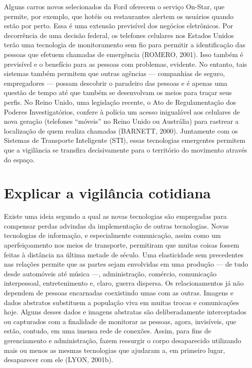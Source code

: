 Alguns carros novos selecionados da Ford oferecem o serviço On-Star, que
permite, por exemplo, que hotéis ou restaurantes alertem os usuários
quando estão por perto. Essa é uma extensão previsível dos negócios
eletrônicos. Por decorrência de uma decisão federal, os telefones
celulares nos Estados Unidos terão uma tecnologia de monitoramento sem
fio para permitir a identificação das pessoas que efetuem chamadas de
emergência (ROMERO, 2001). Isso também é previsível e o benefício para
as pessoas com problemas, evidente. No entanto, tais sistemas também
permitem que outras agências --- companhias de seguro, empregadores ---
possam descobrir o paradeiro das pessoas e é apenas uma questão de tempo
até que também se desenvolvam os meios para traçar seus perfis. No Reino
Unido, uma legislação recente, o Ato de Regulamentação dos Poderes
Investigatórios, confere à polícia um acesso inigualável aos celulares
de nova geração (telefones ``móveis'' no Reino Unido ou Austrália) para
rastrear a localização de quem realiza chamadas (BARNETT, 2000).
Juntamente com os Sistemas de Transporte Inteligente (STI), essas
tecnologias emergentes permitem que a vigilância se transfira
decisivamente para o território do movimento através do espaço.

\section{Explicar a vigilância cotidiana}

Existe uma ideia segundo a qual as novas tecnologias são empregadas para
compensar perdas advindas da implementação de outras tecnologias. Novas
tecnologias de informação, e especialmente comunicação, assim como um
aperfeiçoamento nos meios de transporte, permitiram que muitas coisas
fossem feitas à distância na última metade de século. Uma elasticidade
sem precedentes nas relações permite que as partes sejam envolvidas em
uma produção --- de tudo desde automóveis até música ---, administração,
comércio, comunicação interpessoal, entretenimento e, claro, guerra
dispersa. Os relacionamentos já não dependem de pessoas encarnadas
coexistindo umas com as outras. Imagens e dados abstratos substituem a
população viva em muitas trocas e comunicações hoje. Alguns desses dados
e imagens abstratas são deliberadamente interceptados ou capturados com
a finalidade de monitorar as pessoas, agora, invisíveis, que estão,
contudo, em uma imensa rede de conexões. Assim, para fins de
gerenciamento e administração, fazem ressurgir o corpo desaparecido
utilizando mais ou menos as mesmas tecnologias que ajudaram a, em
primeiro lugar, desaparecer com ele (LYON, 2001b).

